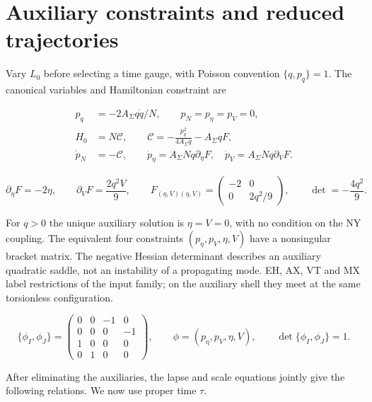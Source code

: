 \section{Auxiliary constraints and reduced trajectories}

Vary $L_0$ before selecting a time gauge, with Poisson convention $\{q,p_q\}=1$. The canonical variables and Hamiltonian constraint are

\begin{equation}\tag{H-01}\label{eq:H-01}
\begin{aligned}
p_q&=-2A_{\Sigma}q\dot q/N,\qquad p_N=p_{\eta}=p_V=0,\\
H_0&=N\mathcal C,\qquad
\mathcal C=-\frac{p_q^2}{4A_{\Sigma}q}-A_{\Sigma}qF,\\
\dot p_N&=-\mathcal C,\qquad
\dot p_{\eta}=A_{\Sigma}Nq\partial_{\eta}F,\quad
\dot p_V=A_{\Sigma}Nq\partial_VF.
\end{aligned}
\end{equation}

\begin{equation}\tag{H-02}\label{eq:H-02}
\partial_{\eta}F=-2\eta,\qquad \partial_VF=\frac{2q^2V}{9},\qquad
F_{(\eta,V)(\eta,V)}=\begin{pmatrix}-2&0\\0&2q^2/9\end{pmatrix},\qquad
\det=-\frac{4q^2}{9}.
\end{equation}

For $q>0$ the unique auxiliary solution is $\eta=V=0$, with no condition on the NY coupling. The equivalent four constraints $(p_{\eta},p_V,\eta,V)$ have a nonsingular bracket matrix. The negative Hessian determinant describes an auxiliary quadratic saddle, not an instability of a propagating mode. EH, AX, VT and MX label restrictions of the input family; on the auxiliary shell they meet at the same torsionless configuration.

\begin{equation}\tag{H-03}\label{eq:H-03}
\{\phi_I,\phi_J\}=
\begin{pmatrix}0&0&-1&0\\0&0&0&-1\\1&0&0&0\\0&1&0&0\end{pmatrix},\qquad
\phi=(p_{\eta},p_V,\eta,V),\qquad \det\{\phi_I,\phi_J\}=1.
\end{equation}

After eliminating the auxiliaries, the lapse and scale equations jointly give the following relations. We now use proper time $\tau$.

